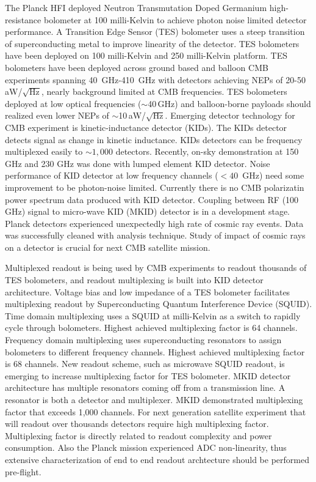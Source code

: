 The Planck HFI deployed Neutron Transmutation Doped Germanium high-resistance bolometer at 100 milli-Kelvin to achieve photon noise limited detector performance.
A Transition Edge Sensor (TES) bolometer uses a steep transition of superconducting metal to improve linearity of the detector.
TES bolometers have been deployed on 100 milli-Kelvin and 250 milli-Kelvin platform. 
TES bolometers have been deployed across ground based and balloon CMB experiments spanning 40~GHz-410~GHz with detectors achieving NEPs of 20-50 aW/$\sqrt{\textrm{Hz}}$, nearly background limited at CMB frequencies. 
TES bolometers deployed at low optical frequencies ($\sim$40\,GHz) and balloon-borne payloads should realized even lower NEPs of $\sim$10\,aW/$\sqrt{\textrm{Hz}}$. 
Emerging detector technology for CMB experiment is kinetic-inductance detector (KIDs). 
The KIDs detector detects signal as change in kinetic inductance. 
KIDs detectors can be frequency multiplexed easily to $\sim1,000$ detectors.
Recently, on-sky demonstration at 150 GHz and 230 GHz was done with lumped element KID detector. 
Noise performance of KID detector at low frequency channels ($< 40$~GHz) need some improvement to be photon-noise limited. 
Currently there is no CMB polarizatin power spectrum data produced with KID detector.
Coupling between RF (100 GHz) signal to micro-wave KID (MKID) detector is in a development stage.
Planck detectors experienced unexpectedly high rate of cosmic ray events.
Data was successfully cleaned with analysis technique. 
Study of impact of cosmic rays on a detector is crucial for next CMB satellite mission.

Multiplexed readout is being used by CMB experiments to readout thousands of TES bolometers, and readout multiplexing is built into KID detector architecture. 
Voltage bias and low impedance of a TES bolometer facilitates multiplexing readout by Superconducting Quantum Interference Device (SQUID). 
Time domain multiplexing uses a SQUID at milli-Kelvin as a switch to rapidly cycle through bolometers. 
Highest achieved multiplexing factor is 64 channels.
Frequency domain multiplexing uses superconducting resonators to assign bolometers to different frequency channels.
Highest achieved multiplexing factor is 68 channels.
New readout scheme, such as microwave SQUID readout, is emerging to increase multiplexing factor for TES bolometer. 
MKID detector architecture has multiple resonators coming off from a transmission line. 
A resonator is both a detector and multiplexer. 
MKID demonstrated multiplexing factor that exceeds 1,000 channels. 
For next generation satellite experiment that will readout over thousands detectors require high multiplexing factor.
Multiplexing factor is directly related to readout complexity and power consumption.
Also the Planck mission experienced ADC non-linearity, thus extensive characterization of end to end readout archtecture should be performed pre-flight. 

